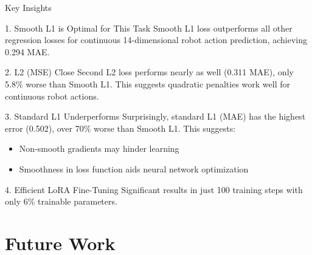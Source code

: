 \documentclass[aspectratio=169]{beamer}
\begin{document}
\begin{frame}{Key Insights}
\begin{block}{1. Smooth L1 is Optimal for This Task}
Smooth L1 loss outperforms all other regression losses for continuous 14-dimensional robot action prediction, achieving 0.294 MAE.
\end{block}

\begin{block}{2. L2 (MSE) Close Second}
L2 loss performs nearly as well (0.311 MAE), only 5.8\% worse than Smooth L1. This suggests quadratic penalties work well for continuous robot actions.
\end{block}

\begin{block}{3. Standard L1 Underperforms}
Surprisingly, standard L1 (MAE) has the highest error (0.502), over 70\% worse than Smooth L1. This suggests:
\begin{itemize}
    \item Non-smooth gradients may hinder learning
    \item Smoothness in loss function aids neural network optimization
\end{itemize}
\end{block}

\begin{block}{4. Efficient LoRA Fine-Tuning}
Significant results in just 100 training steps with only 6\% trainable parameters.
\end{block}
\end{frame}


\section{Future Work}
\end{document}
